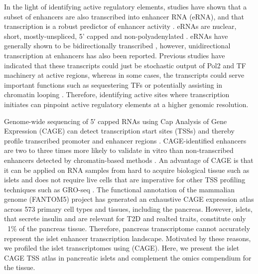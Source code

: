 In the light of identifying active regulatory elements, studies have shown that a subset of enhancers are also transcribed into enhancer RNA (eRNA), and that transcription is a robust predictor of enhancer activity \cite{anderssonAtlasActiveEnhancers2014, mikhaylichenkoDegreeEnhancerPromoter2018}. eRNAs are nuclear, short, mostly-unspliced, 5’ capped and non-polyadenylated \cite{anderssonAtlasActiveEnhancers2014}. eRNAs have generally shown to be bidirectionally transcribed \cite{kimWidespreadTranscriptionNeuronal2010, melgarDiscoveryActiveEnhancers2011, anderssonAtlasActiveEnhancers2014}, however, unidirectional transcription at enhancers has also been reported. Previous studies have indicated that these transcripts could just be stochastic output of Pol2 and TF machinery at active regions, whereas in some cases, the transcripts could serve important functions such as sequestering TFs or potentially assisting in chromatin looping \cite{kaikkonenRemodelingEnhancerLandscape2013, hsiehEnhancerRNAsParticipate2014, liFunctionalRolesEnhancer2013, yangEnhancerRNAdrivenLooping2016a}. Therefore, identifying active sites where transcription initiates can pinpoint active regulatory elements at a higher genomic resolution.
                 
Genome-wide sequencing of 5′ capped RNAs using Cap Analysis of Gene Expression (CAGE) can detect transcription start sites (TSSs) and thereby profile transcribed promoter and enhancer regions \cite{kimWidespreadTranscriptionNeuronal2010, anderssonAtlasActiveEnhancers2014}. CAGE-identified enhancers are two to three times more likely to validate in vitro than non-transcribed enhancers detected by chromatin-based methods \cite{anderssonAtlasActiveEnhancers2014}. An advantage of CAGE is that it can be applied on RNA samples from hard to acquire biological tissue such as islets and does not require live cells that are imperative for other TSS profiling techniques such as GRO-seq \cite{coreNascentRNASequencing2008, lopesGROseqToolIdentification2017}. The functional annotation of the mammalian genome (FANTOM5) project \cite{clstdgtPromoterlevelMammalianExpression2014} has generated an exhaustive CAGE expression atlas across 573 primary cell types and tissues, including the pancreas. However, islets, that secrete insulin and are relevant for T2D and realted traits, constitute only ~1\% of the pancreas tissue. Therefore, pancreas transcriptome cannot accurately represent the islet enhancer transcription landscape. Motivated by these reasons, we profiled the islet transcriptomes using (CAGE). Here, we present the islet CAGE TSS atlas in pancreatic islets and complement the omics compendium for the tissue.


